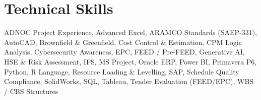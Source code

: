 \documentclass[11pt,a4paper]{article}
\begin{document}
\section{Technical Skills}
\noindent ADNOC Project Experience, Advanced Excel, ARAMCO Standards (SAEP-331), AutoCAD, Brownfield \& Greenfield, Cost Control \& Estimation, CPM Logic Analysis, Cybersecurity Awareness, EPC, FEED / Pre-FEED, Generative AI, HSE \& Risk Assessment, IFS, MS Project, Oracle ERP, Power BI, Primavera P6, Python, R Language, Resource Loading \& Levelling, SAP, Schedule Quality Compliance, SolidWorks, SQL, Tableau, Tender Evaluation (FEED/EPC), WBS / CBS Structures
\end{document}
